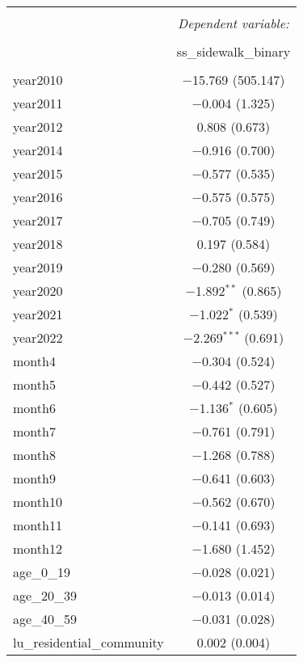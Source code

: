 \begin{table}[!htbp] \centering 
  \caption{} 
  \label{} 
\small 
\begin{tabular}{@{\extracolsep{1pt}}lc} 
\\[-1.8ex]\hline 
\hline \\[-1.8ex] 
 & \multicolumn{1}{c}{\textit{Dependent variable:}} \\ 
\cline{2-2} 
\\[-1.8ex] & ss\_sidewalk\_binary \\ 
\hline \\[-1.8ex] 
 year2010 & $-$15.769 (505.147) \\ 
  year2011 & $-$0.004 (1.325) \\ 
  year2012 & 0.808 (0.673) \\ 
  year2014 & $-$0.916 (0.700) \\ 
  year2015 & $-$0.577 (0.535) \\ 
  year2016 & $-$0.575 (0.575) \\ 
  year2017 & $-$0.705 (0.749) \\ 
  year2018 & 0.197 (0.584) \\ 
  year2019 & $-$0.280 (0.569) \\ 
  year2020 & $-$1.892$^{**}$ (0.865) \\ 
  year2021 & $-$1.022$^{*}$ (0.539) \\ 
  year2022 & $-$2.269$^{***}$ (0.691) \\ 
  month4 & $-$0.304 (0.524) \\ 
  month5 & $-$0.442 (0.527) \\ 
  month6 & $-$1.136$^{*}$ (0.605) \\ 
  month7 & $-$0.761 (0.791) \\ 
  month8 & $-$1.268 (0.788) \\ 
  month9 & $-$0.641 (0.603) \\ 
  month10 & $-$0.562 (0.670) \\ 
  month11 & $-$0.141 (0.693) \\ 
  month12 & $-$1.680 (1.452) \\ 
  age\_0\_19 & $-$0.028 (0.021) \\ 
  age\_20\_39 & $-$0.013 (0.014) \\ 
  age\_40\_59 & $-$0.031 (0.028) \\ 
  lu\_residential\_community & 0.002 (0.004) \\ 

\end{tabular}
\end{table}
